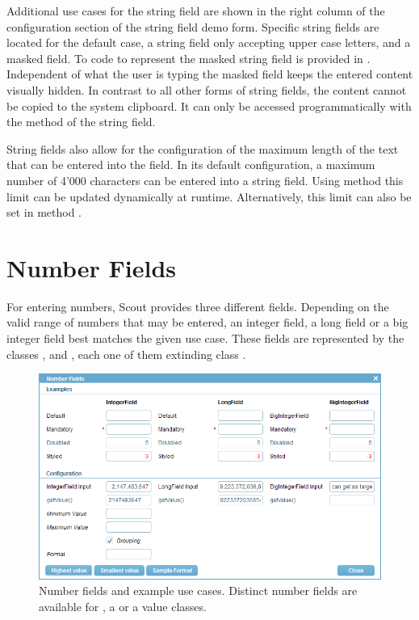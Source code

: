 \documentclass[a4paper,10pt,twoside]{book}
\begin{document}
Additional use cases for the string field are shown in the right column of the configuration section of the string field demo form. 
Specific string fields are located for the default case, a string field only accepting upper case letters, and a masked field. 
To code to represent the masked string field is provided in .
Independent of what the user is typing the masked field keeps the entered content visually hidden. 
In contrast to all other forms of string fields, the content cannot be copied to the system clipboard.
It can only be accessed programmatically with the  method of the string field.

String fields also allow for the configuration of the maximum length of the text that can be entered into the field. 
In its default configuration, a maximum number of 4'000 characters can be entered into a string field. 
Using method  this limit can be updated dynamically at runtime. 
Alternatively, this limit can also be set in method . 

\section{Number Fields}

For entering numbers, Scout provides three different fields.
Depending on the valid range of numbers that may be entered, an integer field, a long field or a big integer field best matches the given use case.
These fields are represented by the classes ,  and , each one of them extinding class .

\begin{figure}
\includegraphics[width=15cm]{numberfield.png}
\caption{Number fields and example use cases.
Distinct number fields are available for , a  or a  value classes.
}
\end{figure}
\end{document}
